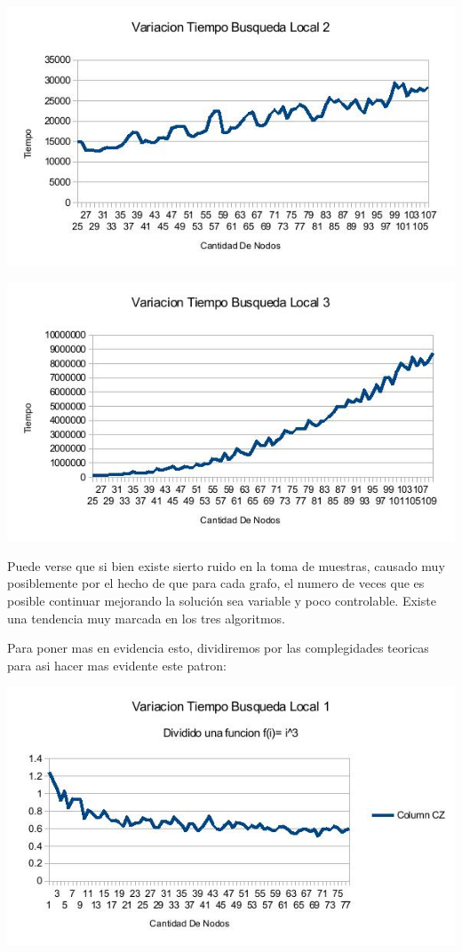 \includegraphics[scale=0.5]{Ej4/tiempo2.jpg}

\includegraphics[scale=0.5]{Ej4/tiempo3.jpg}

Puede verse que si bien existe sierto ruido en la toma de muestras, causado muy posiblemente por el hecho de que para cada grafo, el numero de veces que es posible continuar mejorando la solución sea variable y poco controlable. Existe una tendencia muy marcada en los tres algoritmos.

Para poner mas en evidencia esto, dividiremos por las complegidades teoricas para asi hacer mas evidente este patron:

\includegraphics[scale=0.5]{Ej4/tiempo1div.jpg}

